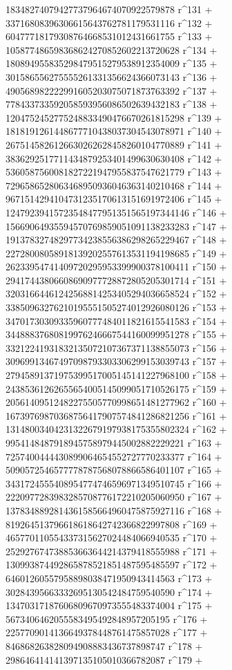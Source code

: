        18348274079427737964674070922579878 r^131 + 
       33716808396306615643762781179531116 r^132 + 
       60477718179308764668531012431661755 r^133 + 
       105877486598368624270852602213720628 r^134 + 
       180894955835298479515279538912354009 r^135 + 
       301586556275555261331356624366073143 r^136 + 
       490568982222991605203075071873763392 r^137 + 
       778433733592058593956086502639432183 r^138 + 
       1204752452775248833490476670261815298 r^139 + 
       1818191261448677710438037304543078971 r^140 + 
       2675145826126630262628458260104770889 r^141 + 
       3836292517711434879253401499630630408 r^142 + 
       5360587560081827221947955837547621779 r^143 + 
       7296586528063468950936046363140210468 r^144 + 
       9671514294104731235170613151691972406 r^145 + 
       12479239415723548477951351565197344146 r^146 + 
       15669064935594570769859051091138233283 r^147 + 
       19137832748297734238556386298265229467 r^148 + 
       22728008058918139202557613531194198685 r^149 + 
       26233954741409720295953399900378100411 r^150 + 
       29417443806608690977728872805205301714 r^151 + 
       32031664461242568814253405294036658524 r^152 + 
       33850963276210195551505274012926080126 r^153 + 
       34701730309335960777484011821615541583 r^154 + 
       34488837680819976246667544160099951278 r^155 + 
       33212241931832135072107367371138855073 r^156 + 
       30969913467497098793303306299153039743 r^157 + 
       27945891371975399517005145141227968100 r^158 + 
       24385361262655654005145099051710526175 r^159 + 
       20561409512482275505770998651481277962 r^160 + 
       16739769870368756417907574841286821256 r^161 + 
       13148003404231322679197938175355802324 r^162 + 
       9954148487918945758979445002882229221 r^163 + 
       7257400444430899064654552727770233377 r^164 + 
       5090572546577778787568078866586401107 r^165 + 
       3431724555408954774746596971349510745 r^166 + 
       2220977283983285708776172210205060950 r^167 + 
       1378348892814361585664960475875927116 r^168 + 
       819264513796618618642742366822997808 r^169 + 
       465770110554337315627024484066940535 r^170 + 
       252927674738853663644214379418555988 r^171 + 
       130993874492865878521851487595485597 r^172 + 
       64601260557958898038471950943414563 r^173 + 
       30284395663332695130542484759540590 r^174 + 
       13470317187606809670973555483374004 r^175 + 
       5673406462055583495492848957205195 r^176 + 
       2257709014136649378448761475857028 r^177 + 
       846868263828094908883436737898747 r^178 + 
       298646414141397135105010366782087 r^179 + 
